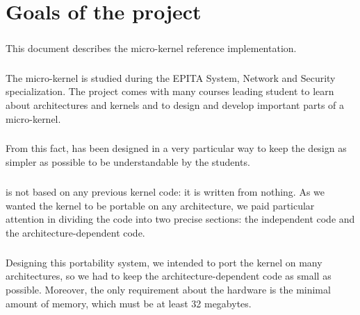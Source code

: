 
%
%

\chapter{Goals of the \kaneton project}

\newpage

\paragraph{}
This   document   describes   the  \kaneton   micro-kernel   reference
implementation.

\paragraph{}
The \kaneton micro-kernel is  studied during the EPITA System, Network
and  Security specialization.   The  project comes  with many  courses
leading student to learn about architectures and kernels and to design
and develop important parts of a micro-kernel.

\paragraph{}
From this fact, \kaneton has been designed in a very particular way to
keep the  design as  simpler as possible  to be understandable  by the
students.

\paragraph{}
\kaneton is not based on any previous kernel code: it is written from
nothing. As we  wanted the kernel to be  portable on any architecture,
we paid  particular attention  in dividing the  code into  two precise
sections: the independent code and the architecture-dependent code.

\paragraph{}
Designing this portability  system, we intended to port  the kernel on
many architectures, so we  had to keep the architecture-dependent code
as  small  as possible.   Moreover,  the  only  requirement about  the
hardware is  the minimal amount of  memory, which must be  at least 32
megabytes.


